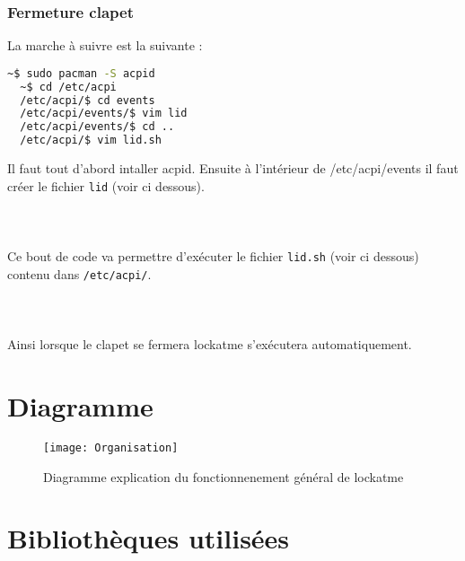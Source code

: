     \subsubsection{Fermeture clapet}
La marche à suivre est la suivante :
\begin{lstlisting}[language=bash]
  ~$ sudo pacman -S acpid
  ~$ cd /etc/acpi
  /etc/acpi/$ cd events
  /etc/acpi/events/$ vim lid
  /etc/acpi/events/$ cd ..
  /etc/acpi/$ vim lid.sh
\end{lstlisting}
Il faut tout d'abord intaller acpid. Ensuite à
l'intérieur de /etc/acpi/events il faut créer le
fichier \verb|lid| (voir ci dessous).\\
\\
\\
\\
Ce bout de code va permettre d'exécuter le fichier \verb|lid.sh| (voir ci dessous)
contenu dans \verb|/etc/acpi/|.\\
\\
\\
\\
Ainsi lorsque le clapet se fermera lockatme s'exécutera automatiquement.
\newpage

\section{Diagramme}
  \begin{figure}[h]
    \begin{center}
    \texttt{[image: Organisation]}
    \caption{Diagramme explication du fonctionnenement général de lockatme}
  \end{center}
  \end{figure}

\newpage

\section{Bibliothèques utilisées}
